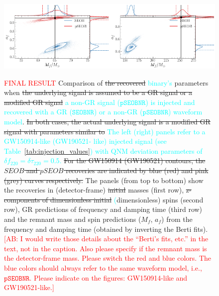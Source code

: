 \documentclass[twocolumn,prd,aps,superscriptaddress,preprintnumbers,tightenlines,showpacs,nofootinbib,eqsecnum,amsfonts,amsmath]{revtex4-1}
\newcommand{\ab}[1]{\textcolor{cyan}{#1}}
\newcommand{\comment}[1]{\textcolor{red}{[#1]}}
\newcommand{\df}[1]{\delta f_{\text{#1}}}
\newcommand{\dtau}[1]{\delta \tau_{\text{#1}}}
\newcommand{\pSEOB}{\texttt{pSEOBNR}}
\newcommand{\SEOB}{\texttt{SEOBNR}}
\begin{document}
\begin{figure}
	\includegraphics[width=0.5\textwidth]{figures/GW150914_simulated_signal_0p5_gr_ngr_Mfaf.png}\includegraphics[width=0.5\textwidth]{figures/GW190521_simulated_signal_0p5_gr_ngr_Mfaf.png}
	\caption{\textcolor{red}{FINAL RESULT} Comparison of \sout{the recovered} \ab{binary's} parameters when \sout{the underlying signal is assumed to be a GR signal or a modified GR signal} \ab{a non-GR signal ($\pSEOB$) is injected and recovered with a GR ($\SEOB$) or a non-GR ($\pSEOB$) waveform model}. \sout{In both cases, the actual underlying signal is a modified GR signal with parameters similar to} \ab{The left (right) panels refer to 
a GW150914-like (GW190521- like) injected signal (see Table~\ref{tab:injection_values}) with QNM deviation parameters of $\df{220} = \dtau{220} = 0.5$.} \sout{For the GW150914 (GW190521) contours, the $SEOB$ and $pSEOB$ recoveries are indicated by blue (red) and pink (grey) curves respectively.} The panels (from top to bottom) show the recoveries in (detector-frame) \sout{initial} masses (first row), \sout{z-components of dimensionless initial} \ab(dimensionless) spins (second row), GR predictions of frequency and damping time (third row) and the remnant mass and spin predictions ($M_f$, $a_f$) from the frequency and damping time 
(obtained by inverting the Berti fits). \comment{AB: I would write those details about the ``Berti's fits, etc.'' in the text, not in the caption. Also please specify if the remnant mass is the detector-frame mass. Please 
switch the red and blue colors. The blue colors should always refer to the same waveform model, i.e., $\pSEOB$. Please indicate on the figures: GW150914-like and GW190521-like.}}
	\label{fig:gr_ngr_comparison}
\end{figure}
\end{document}
